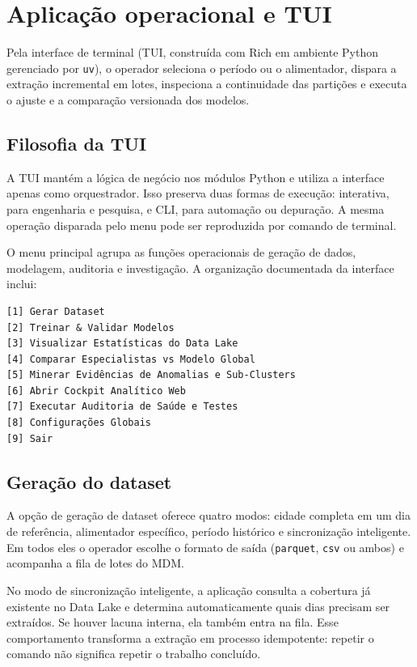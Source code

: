 \chapter{Aplicação operacional e TUI}\label{aplicauxe7uxe3o-operacional-e-tui}

Pela interface de terminal (TUI, construída com Rich em ambiente Python gerenciado por \texttt{uv}), o operador seleciona o período ou o alimentador, dispara a extração incremental em lotes, inspeciona a continuidade das partições e executa o ajuste e a comparação versionada dos modelos.

\section{Filosofia da TUI}\label{filosofia-da-tui}

A TUI mantém a lógica de negócio nos módulos Python e utiliza a interface apenas como orquestrador. Isso preserva duas formas de execução: interativa, para engenharia e pesquisa, e CLI, para automação ou depuração. A mesma operação disparada pelo menu pode ser reproduzida por comando de terminal.

O menu principal agrupa as funções operacionais de geração de dados, modelagem, auditoria e investigação. A organização documentada da interface inclui:

\begin{verbatim}
[1] Gerar Dataset
[2] Treinar & Validar Modelos
[3] Visualizar Estatísticas do Data Lake
[4] Comparar Especialistas vs Modelo Global
[5] Minerar Evidências de Anomalias e Sub-Clusters
[6] Abrir Cockpit Analítico Web
[7] Executar Auditoria de Saúde e Testes
[8] Configurações Globais
[9] Sair
\end{verbatim}

\section{Geração do dataset}\label{gerauxe7uxe3o-do-dataset}

A opção de geração de dataset oferece quatro modos: cidade completa em um dia de referência, alimentador específico, período histórico e sincronização inteligente. Em todos eles o operador escolhe o formato de saída (\texttt{parquet}, \texttt{csv} ou ambos) e acompanha a fila de lotes do MDM.

No modo de sincronização inteligente, a aplicação consulta a cobertura já existente no Data Lake e determina automaticamente quais dias precisam ser extraídos. Se houver lacuna interna, ela também entra na fila. Esse comportamento transforma a extração em processo idempotente: repetir o comando não significa repetir o trabalho concluído.

